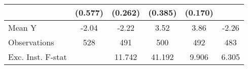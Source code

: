 {\begin{tabular}{l*{5}{c}}
            &     (0.577)         &     (0.262)         &     (0.385)         &     (0.170)         &                     \\
\midrule
Mean Y      &       -2.04         &       -2.22         &        3.52         &        3.86         &       -2.26         \\
Observations&         528         &         491         &         500         &         492         &         483         \\
Exc. Inst. F-stat&                     &      11.742         &      41.192         &       9.906         &       6.305         \\
\bottomrule
\end{tabular}
}
